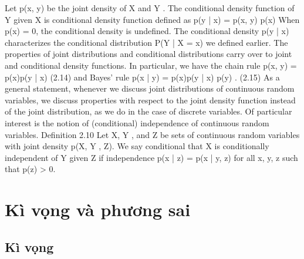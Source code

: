 Let p(x, y) be the joint density of X and Y . The conditional density function of Y given X is conditional density function defined as p(y | x) = p(x, y) p(x) When p(x) = 0, the conditional density is undefined. The conditional density p(y | x) characterizes the conditional distribution P(Y | X = x) we defined earlier. The properties of joint distributions and conditional distributions carry over to joint and conditional density functions. In particular, we have the chain rule p(x, y) = p(x)p(y | x) (2.14) and Bayes’ rule p(x | y) = p(x)p(y | x) p(y) . (2.15) As a general statement, whenever we discuss joint distributions of continuous random variables, we discuss properties with respect to the joint density function instead of the joint distribution, as we do in the case of discrete variables. Of particular interest is the notion of (conditional) independence of continuous random variables. Definition 2.10 Let X, Y , and Z be sets of continuous random variables with joint density p(X, Y , Z). We say conditional that X is conditionally independent of Y given Z if independence p(x | z) = p(x | y, z) for all x, y, z such that p(z) > 0.

\section{Kì vọng và phương sai}

\subsection{Kì vọng}



